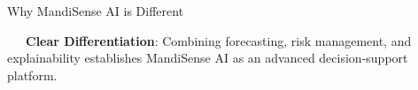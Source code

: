 \documentclass{beamer}
\begin{document}
\begin{frame}{Why MandiSense AI is Different}
\vspace{0.15cm}
\begin{tcolorbox}[enhanced, colback=primaryblue!4, colframe=primaryblue!30, boxrule=0.35pt,
  arc=3.5pt, width=0.98\textwidth, left=4pt, right=4pt, top=2.5pt, bottom=2.5pt, boxsep=0pt,
  halign=center, shadow={0.5pt}{-0.5pt}{0pt}{black!8}]
    \fontsize{5.5pt}{6.5pt}\selectfont
    \textcolor{primaryDark}{~~~\textbf{Clear Differentiation}: Combining forecasting, risk management, and explainability establishes MandiSense AI as an advanced decision-support platform.}
\end{tcolorbox}
\end{frame}

\end{document}
